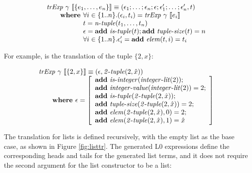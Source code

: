 \[
\begin{array}{l}
\trExp{\gamma}{\{e_1, \ldots, e_n\}} \equiv (\epsilon_1; \dots; \epsilon_n;\epsilon;\epsilon'_1; \dots; \epsilon'_n, t)\\
\qquad \textbf{where } \forall i \in \{1..n\}. (\epsilon_i, t_i) = \trExp{\gamma}{e_i}\\
\qquad \phantom{\textbf{where }} t = \mathit{n\mbox{-}tuple}(t_1, \ldots, t_n)\\
\qquad \phantom{\textbf{where }} \epsilon = \addE~\istuple{t};\addE~\mathit{tuple\mbox{-}size}(t) = n\\
\qquad \phantom{\textbf{where }} \forall i \in \{1..n\}. \epsilon'_i = \addE~\mathit{elem}(t, i) = t_i\\
\end{array}
\]

For example, is the translation of the tuple $\{2, x\}$:

\[
\begin{array}{l}
\mathit{trExp}~\gamma~\llbracket\{2, x\}\rrbracket \equiv (\epsilon, \mathit{2\mbox{-}tuple}(2,\hat{x}))\\
\qquad \textbf{where } \epsilon = \left[ 
\begin{array}{l}
\textbf{add}~\mathit{is\mbox{-}integer}(\mathit{integer\mbox{-}lit}(2));\\
\textbf{add}~\mathit{integer\mbox{-}value}(\mathit{integer\mbox{-}lit}(2)) = 2;\\
\textbf{add}~\mathit{is\mbox{-}tuple}(\mathit{2\mbox{-}tuple}(2,\hat{x}));\\
\textbf{add}~\mathit{tuple\mbox{-}size}(\mathit{2\mbox{-}tuple}(2,\hat{x})) = 2;\\
\textbf{add}~\mathit{elem}(\mathit{2\mbox{-}tuple}(2,\hat{x}), 0) = 2;\\
\textbf{add}~\mathit{elem}(\mathit{2\mbox{-}tuple}(2,\hat{x}), 1) = \hat{x}
\end{array}
\right]
\end{array}
\]

The translation for lists is defined recursively, with the empty list as the
base case, as shown in Figure \ref{fig:listtr}. The generated L0 expressions
define the corresponding heads and tails for the generated list terms, and it
does not require the second argument for the list constructor to be a list:

